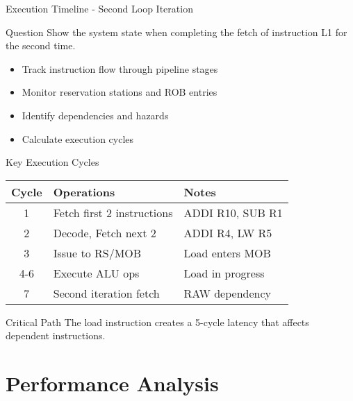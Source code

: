 \documentclass[aspectratio=169,12pt]{beamer}
\begin{document}
\begin{frame}{Execution Timeline - Second Loop Iteration}
\begin{block}{Question}
Show the system state when completing the fetch of instruction L1 for the second time.
\end{block}

\begin{itemize}
    \item Track instruction flow through pipeline stages
    \item Monitor reservation stations and ROB entries
    \item Identify dependencies and hazards
    \item Calculate execution cycles
\end{itemize}
\end{frame}

\begin{frame}{Key Execution Cycles}
\begin{table}
\centering
\begin{tabular}{|c|l|l|}
\hline
\textbf{Cycle} & \textbf{Operations} & \textbf{Notes} \\
\hline
1 & Fetch first 2 instructions & ADDI R10, SUB R1 \\
\hline
2 & Decode, Fetch next 2 & ADDI R4, LW R5 \\
\hline
3 & Issue to RS/MOB & Load enters MOB \\
\hline
4-6 & Execute ALU ops & Load in progress \\
\hline
7 & Second iteration fetch & RAW dependency \\
\hline
\end{tabular}
\end{table}

\begin{alertblock}{Critical Path}
The load instruction creates a 5-cycle latency that affects dependent instructions.
\end{alertblock}
\end{frame}

\section{Performance Analysis}
\end{document}
